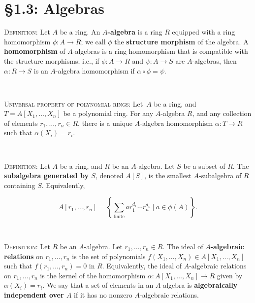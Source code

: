 \documentclass[12pt]{amsart}
\newcommand{\showsol}[1]{\def\displaysol{#1}}
\begin{document}
\showsol{0}
	
	\thispagestyle{empty}
	
	\section*{\S1.3: Algebras}	

\begin{framed}

\noindent \textsc{Definition:} Let $A$ be a ring. An \textbf{$A$-algebra} is a ring $R$ equipped with a ring homomorphism ${\phi:A\to R}$; we call $\phi$ the \textbf{structure morphism} of the algebra\footnotemark. A \textbf{homomorphism} of $A$-algebras is a ring homomorphism that is compatible with the structure morphisms; i.e., if $\phi:A\to R$ and $\psi:A\to S$ are $A$-algebras, then $\alpha:R\to S$ is an $A$-algebra homomorphism if $\alpha\circ \phi = \psi$.


\

\noindent \textsc{Universal property of polynomial rings:} Let\footnotemark \ $A$ be a ring, and $T=A[X_1,\dots,X_n]$ be a polynomial ring. For any $A$-algebra $R$, and any collection of elements $r_1,\dots,r_n\in R$, there is a unique $A$-algebra homomorphism $\alpha: T\to R$ such that $\alpha(X_i) = r_i$.


\


\noindent \textsc{Definition:} Let $A$ be a ring, and $R$ be an $A$-algebra. Let $S$ be a subset of $R$. The \textbf{subalgebra generated by $S$}, denoted $A[S]$, is the smallest $A$-subalgebra of $R$ containing $S$. Equivalently\footnotemark,

\[ A[r_1,\dots,r_n] = \left\{ \sum_{\mathrm{finite}} a r_1^{d_1} \cdots r_n^{d_n} \ | \ a\in \phi(A) \right\}.\]

\


\noindent \textsc{Definition:} Let $R$ be an $A$-algebra. Let $r_1,\dots,r_n\in R$. The ideal of \textbf{$A$-algebraic relations} on $r_1,\dots,r_n$ is the set of polynomials $f(X_1,\dots,X_n)\in A[X_1,\dots,X_n]$ such that ${f(r_1,\dots,r_n)=0}$ in $R$. Equivalently, the ideal of $A$-algebraic relations on $r_1,\dots,r_n$ is the kernel of the homomorphism ${\alpha: A[X_1,\dots,X_n]\to R}$ given by $\alpha(X_i)=r_i$. We say that a set of elements in an $A$-algebra is \textbf{algebraically independent over $A$} if it has  no nonzero $A$-algebraic relations.


\end{framed}
\end{document}
